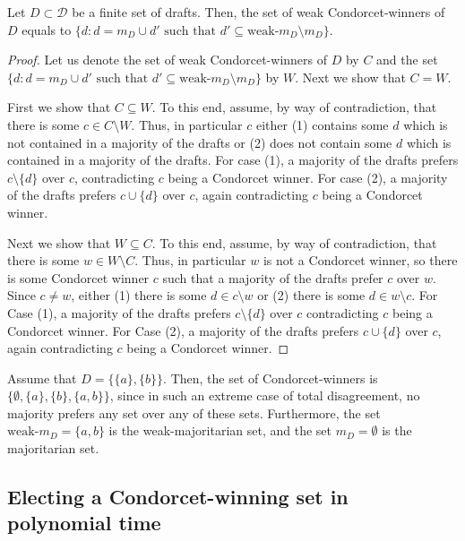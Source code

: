 \documentclass[sigconf]{aamas}  %
\newcommand{\calD}{\mathcal{D}}
\begin{document}
\begin{lemma}
  Let $D \subset \calD$ be a finite set of drafts.
  Then, the set of weak Condorcet-winners of $D$ equals to $\{ d : d = m_D \cup d'  \textrm{ such that }  d' \subseteq \textrm{weak-}m_D \setminus m_D \}$.
\end{lemma}

\begin{proof}
%
Let us denote the set of weak Condorcet-winners of $D$ by $C$ and the set $\{ d : d = m_D \cup d'  \textrm{ such that }  d' \subseteq \textrm{weak-}m_D \setminus m_D \}$ by $W$. Next we show that $C = W$.

First we show that $C \subseteq W$.
To this end, assume, by way of contradiction, that there is some $c \in C \setminus W$. Thus, in particular $c$ either (1) contains some $d$ which is not contained in a majority of the drafts or (2) does not contain some $d$ which is contained in a majority of the drafts.
For case (1), a majority of the drafts prefers  $c \setminus \{d\}$ over $c$, contradicting $c$ being a Condorcet winner. For case (2), a majority of the drafts prefers $c \cup \{d\}$ over $c$, again contradicting $c$ being a Condorcet winner.

Next we show that $W \subseteq C$.
To this end, assume, by way of contradiction, that there is some $w \in W \setminus C$. Thus, in particular $w$ is not a Condorcet winner, so there is some Condorcet winner $c$ such that a majority of the drafts prefer $c$ over $w$. Since $c \neq w$, either (1) there is some $d \in c \setminus w$ or (2) there is some $d \in w \setminus c$.
For Case (1), a majority of the drafts prefers $c \setminus \{d\}$ over $c$ contradicting $c$ being a Condorcet winner.
For Case (2), a majority of the drafts prefers $c \cup \{d\}$ over $c$, again contradicting $c$ being a Condorcet winner.
%
\end{proof}

\begin{example}
%
Assume that $D = \{ \{a\}, \{b\} \}$.
Then, the set of Condorcet-winners is
$\{ \emptyset, \{a\}, \{b\}, \{a,b\} \}$, since in such an extreme case of total disagreement, no majority prefers any set over any of these sets.
Furthermore, the set $\textrm{weak-}m_D = \{a, b\}$ is the weak-majoritarian set, and the set $m_D = \emptyset$ is the majoritarian set.
%
\end{example}

\subsection{Electing a Condorcet-winning set in polynomial time}
\end{document}
